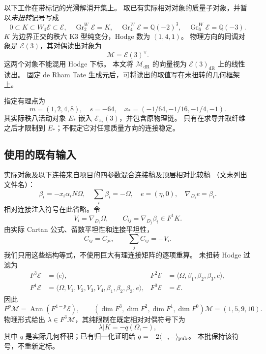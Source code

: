 \documentclass[11pt,a4paper]{ctexart}
\theoremstyle{cnplain}
\theoremstyle{definition}
\theoremstyle{remark}
\newcommand{\Q}{\mathbb Q}
\newcommand{\dR}{\mathrm{dR}}
\newcommand{\Ann}{\operatorname{Ann}}
\newcommand{\Gr}{\operatorname{Gr}}
\newcommand{\cE}{\mathcal E}
\newcommand{\cM}{\mathcal M}
\begin{document}
以下工作在带标记的光滑解消开集上。
取已有实际相对对象的质量子对象，并暂以\emph{未扭转}记号写成
\begin{equation}\label{eq:mass}
 0\subset K\subset W_4\cE\subset\cE,
 \quad \Gr^W_2\cE=K,\quad
 \Gr^W_4\cE=\Q(-2)^3,\quad
 \Gr^W_6\cE=\Q(-3).
\end{equation}
$K$ 为边界正交的秩六 K3 型纯变分，Hodge 数为 $(1,4,1)$。
物理方向的同调对象是 $\cE(3)$，其对偶读出对象为
\begin{equation}\label{eq:M}
 \cM=\cE(3)^\vee.
\end{equation}
这两个对象不能混用 Hodge 下标。
本文将 $\cM_{\dR}$ 的向量视为 $\cE(3)_{\dR}$ 上的线性读出。
固定 de Rham Tate 生成元后，可将读出的取值写在未扭转的几何框架上。

指定有理点为
\begin{equation}\label{eq:point}
 m=(1,2,4,8),\quad s=-64,\quad
 x_* =(-1/64,-1/16,-1/4,-1).
\end{equation}
其实际秩八活动对象 $E_*$ 嵌入 $\cE_{x_*}(3)$，并包含原物理链。
只有在求导并取纤维之后才限制到 $E_*$；不假定它对任意质量方向的连接稳定。

\subsection{使用的既有输入}
实际对象及以下连接来自项目的四参数混合连接稿及顶层相对比较稿
（文末列出文件名）：
\begin{equation}\label{eq:beta}
 \beta_i=-x_i\alpha_iN\Omega,\quad
 \sum_i\beta_i=-\Omega,\quad e=(\eta,0),\quad
 \nabla_{D_i}e=\beta_i.
\end{equation}
相对连接注入符号在此省略。令
\begin{equation}\label{eq:C}
 V_i=\nabla_{D_i}\Omega,\qquad
 C_{ij}=\nabla_{D_j}\beta_i\in F^1K.
\end{equation}
由实际 Cartan 公式、留数平坦性和连接平坦性，
\begin{equation}\label{eq:sum}
 C_{ij}=C_{ji},\qquad \sum_j C_{ij}=-V_i.
\end{equation}
我们只用这些结构等式，不使用巨大有理连接矩阵的逐项重算。
未扭转 Hodge 过滤为
\begin{align}\label{eq:filterE}
 F^3\cE&=\langle e\rangle,&
 F^2\cE&=\langle\Omega,\beta_1,\beta_2,\beta_3,e\rangle,\nonumber\\
 F^1\cE&=\langle\Omega,V_1,V_2,V_3,V_4,\beta_1,\beta_2,\beta_3,e\rangle,&
 F^0\cE&=\cE.
\end{align}
因此
\begin{equation}\label{eq:dualHodge}
 F^p\cM=\Ann(F^{4-p}\cE),\qquad
 (\dim F^3,\dim F^2,\dim F^1,\dim F^0)\cM=(1,5,9,10).
\end{equation}
物理形式给出 $\lambda\in F^3\cM$，其纯限制在既定相对对偶符号下为
\begin{equation}\label{eq:lambda}
 \lambda|K=-q(\Omega,-),
\end{equation}
其中 $q$ 是实际几何杯积；已有归一化证明给 $q=-2\langle-,-\rangle_{\rm pub}$。
本批保持该符号，不重新定标。
\end{document}

